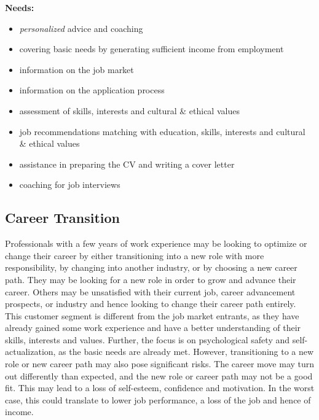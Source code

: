 \noindent\textbf{Needs:}

\begin{itemize}
    \item \textit{personalized} advice and coaching
    \item covering basic needs by generating sufficient income from employment
    \item information on the job market
    \item information on the application process
    \item assessment of skills, interests and cultural \& ethical values
    \item job recommendations matching with education, skills, interests and cultural \& ethical values
    \item assistance in preparing the CV and writing a cover letter
    \item coaching for job interviews
\end{itemize}

\newpage
\subsection{Career Transition}

Professionals with a few years of work experience may be looking to optimize or change their career by either 
transitioning into a new role with more responsibility, by changing into another industry, or by choosing a new
career path. They may be looking for a new role in order to grow and advance their career. Others may be unsatisfied
with their current job, career advancement prospects, or industry and hence looking to change their career path entirely. 
This customer segment is different from the job market entrants, as they have already gained some work experience and
have a better understanding of their skills, interests and values. Further, the focus is on psychological safety and
self-actualization, as the basic needs are already met. However, transitioning to a new role or new career path may
also pose significant risks. The career move may turn out differently than expected, and the new role or career path
may not be a good fit. This may lead to a loss of self-esteem, confidence and motivation. In the worst case, this could
translate to lower job performance, a loss of the job and hence of income.
\newline

